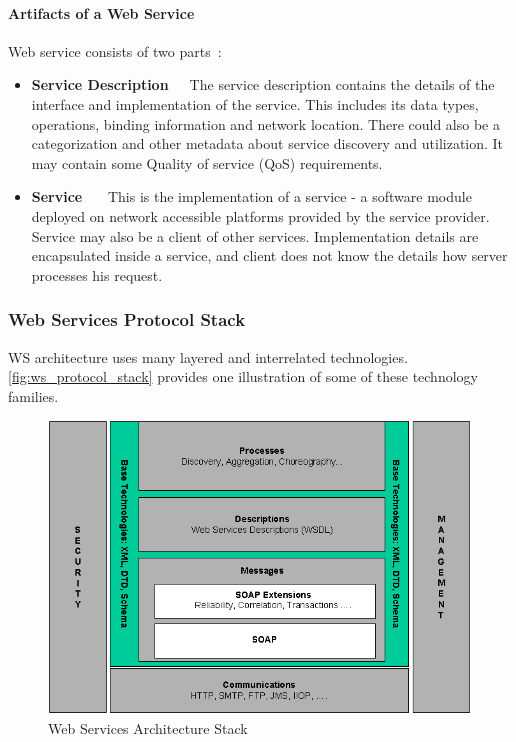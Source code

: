 \paragraph{\textbf{Artifacts of a Web Service}}
\newline
Web service consists of two parts~\cite{Kreger2001-WSC}:
\begin{itemize} 
\item \label{itm:service_description_artifact} 
\textbf{Service Description}~~~The
service description contains the details of the interface and implementation of the service. This includes its data types, operations, binding
information and network location. There could also be a categorization and
other metadata about service discovery and utilization. It may contain some
Quality of service (QoS) requirements. 

 \item \textbf{Service}
 ~~~This is the implementation of a service - a software module deployed on network accessible platforms provided by the service provider.
 Service may also be a client of other services. Implementation details
 are encapsulated inside a service, and client does not know the details how
 server processes his request.
\end{itemize}



\subsubsection{Web Services Protocol Stack}
\label{sec:ws_protocol_stack}

WS architecture uses many layered and interrelated technologies.
\autoref{fig:ws_protocol_stack} provides one illustration of some of these technology families.

\begin{center}
 \begin{figure}[h]
	\includegraphics[width=\textwidth]{../images/preliminaries/ws_protocol_stack.png}
	\caption{Web Services Architecture Stack \cite{ws_arch} }
	\label{fig:ws_protocol_stack}
 \end{figure}
\end{center}

